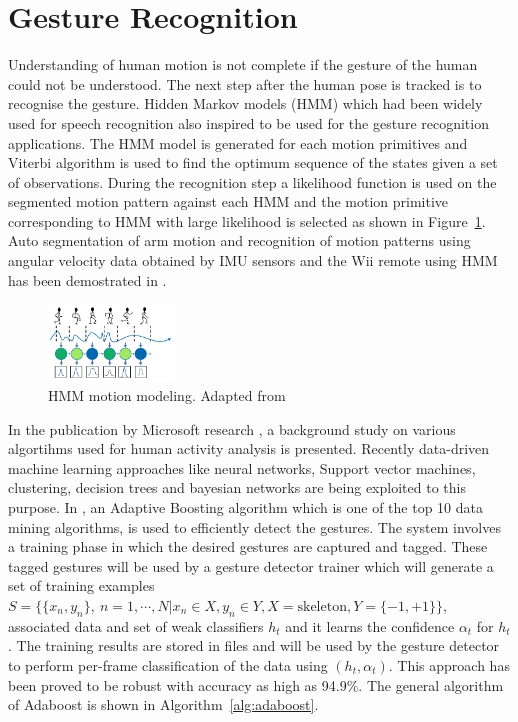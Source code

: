 \section{Gesture Recognition}
	Understanding of human motion is not complete if the gesture of the human could not be understood. The next step after the human pose is tracked is to recognise the gesture. Hidden Markov models (HMM) which had been widely used for speech recognition\cite{rabiner1989tutorial} also inspired to be used for the gesture recognition applications. The HMM model is generated for each motion primitives and Viterbi algorithm is used to find the optimum sequence of the states given a set of observations. During the recognition step a likelihood function is used on the segmented motion pattern against each HMM and the motion primitive corresponding to HMM with large likelihood is selected as shown in Figure~\ref{fig:hmm}. Auto segmentation of arm motion and recognition of motion patterns using angular velocity data obtained by IMU sensors and the Wii remote using HMM has been demostrated in \cite{aoki2013segmentation}. 
\begin{figure}[H]
\centering
\includegraphics[width=0.3\textwidth]{assets/HMM.png}
\caption[HMM motion modeling]{HMM motion modeling. {Adapted from \cite{aoki2013segmentation}}}
\label{fig:hmm}
\end{figure}
	In the publication by Microsoft research \cite{han2013enhanced}, a background study on various algortihms used for human activity analysis is presented. Recently \cite{KinectSDK2014} data-driven machine learning approaches like neural networks, Support vector machines, clustering, decision trees and bayesian networks are being exploited to this purpose. In \cite{KinectSDK2014}, an Adaptive Boosting algorithm\cite{freund1997decision} which is one of the top 10 data mining algorithms, is used to efficiently detect the gestures. The system involves a training phase in which the desired gestures are captured and tagged. These tagged gestures will be used by a gesture detector trainer which will generate a set of training examples $S=\lbrace \lbrace x_n,y_n \rbrace,\ n=1,\cdots,N \vert x_n\in X,y_n\in Y, X=\text{skeleton},Y=\lbrace -1,+1 \rbrace\rbrace$, associated data and set of weak classifiers $h_t$ and it learns the confidence $\alpha_t$ for $h_t$. The training results are stored in files and will be used by the gesture detector to perform per-frame classification of the data using $(h_t,\alpha_t)$. This approach has been proved to be robust with accuracy as high as 94.9\%. The general algorithm of Adaboost is shown in Algorithm~\ref{alg:adaboost}. \\
